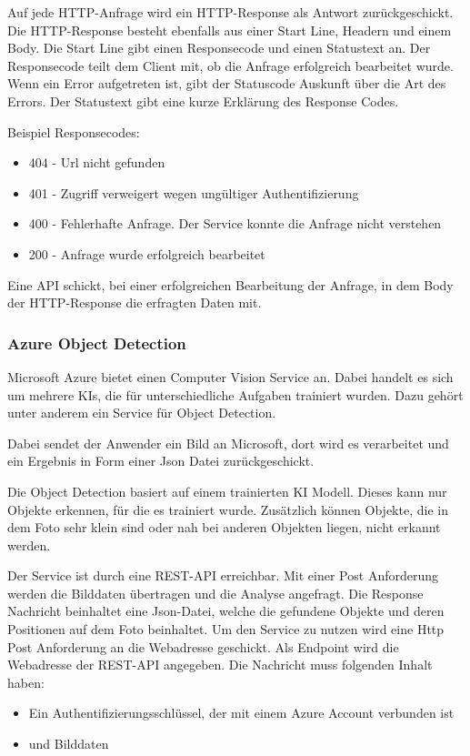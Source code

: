 Auf jede HTTP-Anfrage wird ein HTTP-Response als Antwort zurückgeschickt. 
Die HTTP-Response besteht ebenfalls aus einer Start Line, Headern und einem Body. Die Start Line gibt einen Responsecode und einen Statustext an. Der Responsecode teilt dem Client mit, ob die Anfrage erfolgreich bearbeitet wurde. Wenn ein Error aufgetreten ist, gibt der Statuscode Auskunft über die Art des Errors. Der Statustext gibt eine kurze Erklärung des Response Codes.

Beispiel Responsecodes:
\begin{itemize}
	\item 404 - Url nicht gefunden
	\item 401 - Zugriff verweigert wegen ungültiger Authentifizierung
	\item 400 - Fehlerhafte Anfrage. Der Service konnte die Anfrage nicht verstehen
	\item 200 - Anfrage wurde erfolgreich bearbeitet
\end{itemize}

Eine API schickt, bei einer erfolgreichen Bearbeitung der Anfrage, in dem Body der HTTP-Response die erfragten Daten mit.

\subsubsection{Azure Object Detection}
Microsoft Azure bietet einen Computer Vision Service an. Dabei handelt es sich um mehrere KIs, die für unterschiedliche Aufgaben trainiert wurden. Dazu gehört unter anderem ein Service für Object Detection.

Dabei sendet der Anwender ein Bild an Microsoft, dort wird es verarbeitet und ein Ergebnis in Form einer Json Datei zurückgeschickt.\citep{getAzure,whatIsAzure,objDetectAzure,Azure302Doc}

Die Object Detection basiert auf einem trainierten KI Modell. Dieses kann nur Objekte erkennen, für die es trainiert wurde.
Zusätzlich können Objekte, die in dem Foto sehr klein sind oder nah bei anderen Objekten liegen, nicht erkannt werden.\citep{azureobjdetec}

Der Service ist durch eine REST-API erreichbar. Mit einer Post Anforderung werden die Bilddaten übertragen und die Analyse angefragt. Die Response Nachricht beinhaltet eine Json-Datei, welche die gefundene Objekte und deren Positionen auf dem Foto beinhaltet. 
Um den Service zu nutzen wird eine Http Post Anforderung an die Webadresse geschickt. Als Endpoint wird die Webadresse der REST-API angegeben. Die Nachricht muss folgenden Inhalt haben:
\begin{itemize}
	\item Ein Authentifizierungsschlüssel, der mit einem Azure Account verbunden ist
	\item und Bilddaten
\end{itemize}

